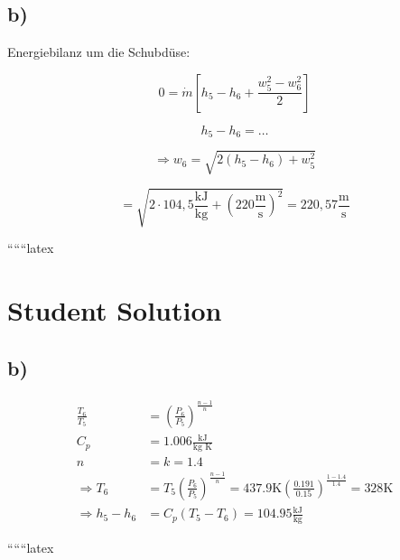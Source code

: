 

\subsection*{b)}

Energiebilanz um die Schubdüse:

\[
0 = \dot{m} \left[ h_5 - h_6 + \frac{w_5^2 - w_6^2}{2} \right]
\]

\[
h_5 - h_6 = \dots
\]

\[
\Rightarrow w_6 = \sqrt{2 \left( h_5 - h_6 \right) + w_5^2}
\]

\[
= \sqrt{2 \cdot 104,5 \frac{\text{kJ}}{\text{kg}} + (220 \frac{\text{m}}{\text{s}})^2} = 220,57 \frac{\text{m}}{\text{s}}
\]

``````latex


\section*{Student Solution}



\subsection*{b)}

\begin{align*}
\frac{T_6}{T_5} &= \left( \frac{P_6}{P_5} \right)^{\frac{n-1}{n}} \\
C_p &= 1.006 \frac{\text{kJ}}{\text{kg K}} \\
n &= k = 1.4 \\
\Rightarrow T_6 &= T_5 \left( \frac{P_6}{P_5} \right)^{\frac{n-1}{n}} = 437.9 \text{K} \left( \frac{0.191}{0.15} \right)^{\frac{1-1.4}{1.4}} = 328 \text{K} \\
\Rightarrow h_5 - h_6 &= C_p (T_5 - T_6) = 104.95 \frac{\text{kJ}}{\text{kg}}
\end{align*}

``````latex